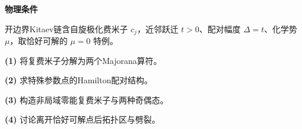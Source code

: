 \textbf{物理条件}\par 开边界Kitaev链含自旋极化费米子 \(c_j\)，近邻跃迁 \(t>0\)、配对幅度 \(\Delta=t\)、化学势 \(\mu\)，取恰好可解的 \(\mu=0\) 特例。
\par\noindent\textbf{(1)} 将复费米子分解为两个Majorana算符。
\par\noindent\textbf{(2)} 求特殊参数点的Hamilton配对结构。
\par\noindent\textbf{(3)} 构造非局域零能复费米子与两种奇偶态。
\par\noindent\textbf{(4)} 讨论离开恰好可解点后拓扑区与劈裂。

